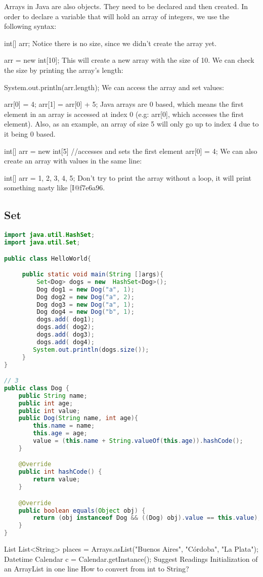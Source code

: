 Arrays in Java are also objects. They need to be declared and then created. In order to declare a variable that will hold an array of integers, we use the following syntax:

int[] arr;
Notice there is no size, since we didn't create the array yet.

arr = new int[10];
This will create a new array with the size of 10. We can check the size by printing the array's length:

System.out.println(arr.length);
We can access the array and set values:

arr[0] = 4;
arr[1] = arr[0] + 5;
Java arrays are 0 based, which means the first element in an array is accessed at index 0 (e.g: arr[0], which accesses the first element). Also, as an example, an array of size 5 will only go up to index 4 due to it being 0 based.

int[] arr = new int[5]
//accesses and sets the first element
arr[0] = 4;
We can also create an array with values in the same line:

int[] arr = {1, 2, 3, 4, 5};
Don't try to print the array without a loop, it will print something nasty like [I@f7e6a96.

\subsection{Set}

\begin{lstlisting}[language=Java]
import java.util.HashSet;
import java.util.Set;

public class HelloWorld{

     public static void main(String []args){
         Set<Dog> dogs = new  HashSet<Dog>();
         Dog dog1 = new Dog("a", 1);
         Dog dog2 = new Dog("a", 2);
         Dog dog3 = new Dog("a", 1);
         Dog dog4 = new Dog("b", 1);
         dogs.add( dog1);
         dogs.add( dog2);
         dogs.add( dog3);
         dogs.add( dog4);
        System.out.println(dogs.size());
     }
}

// 3
public class Dog {
    public String name;
    public int age;
    public int value;
    public Dog(String name, int age){
        this.name = name;
        this.age = age;
        value = (this.name + String.valueOf(this.age)).hashCode();
    }

    @Override
    public int hashCode() {
        return value;
    }

    @Override
    public boolean equals(Object obj) {
        return (obj instanceof Dog && ((Dog) obj).value == this.value);
    }
}
\end{lstlisting}



List
List<String> places = Arrays.asList("Buenos Aires", "Córdoba", "La Plata");
Datetime
Calendar c = Calendar.getInstance();
Suggest Readings
Initialization of an ArrayList in one line
How to convert from int to String?